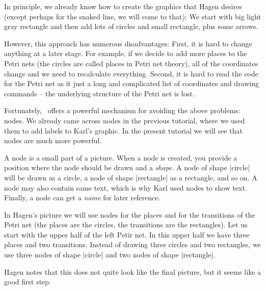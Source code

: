 In principle, we already know how to create the graphics that Hagen
desires (except perhaps for the snaked line, we will come to that): We
start with big light gray rectangle and then add lots of circles and
small rectangle, plus some arrows.

However, this approach has numerous disadvantages: First, it is hard
to change anything at a later stage. For example, if we decide to add
more places to the Petri nets (the circles are called places in Petri
net theory), all of the coordinates change and we need to recalculate
everything. Second, it is hard to read the code for the Petri net as
it just a long and complicated list of coordinates and drawing
commands -- the underlying structure of the Petri net is lost.

Fortunately, \tikzname\ offers a powerful mechanism for avoiding the
above problems: nodes. We already came across nodes in the previous
tutorial, where we used them to add labels to Karl's graphic. In the
present tutorial we will see that nodes are much more powerful.

A node is a small part of a picture. When a node is created, you
provide a position where the node should be drawn and a
\emph{shape}. A node of shape |circle| will be drawn as a circle, a
node of shape |rectangle| as a rectangle, and so on. A node may also
contain same text, which is why Karl used nodes to show text. Finally,
a node can get a \emph{name} for later reference.

In Hagen's picture we will use nodes for the places and for the
transitions of the Petri net (the places are the circles, the
transitions are the rectangles). Let us start with the upper half of
the left Petir net. In this upper half we have three places and two
transitions. Instead of drawing three circles and two rectangles, we
use three nodes of shape |circle| and two nodes of shape
|rectangle|.

\begin{codeexample}[]
\end{codeexample}

Hagen notes that this does not quite look like the final picture, but
it seems like a good first step.

